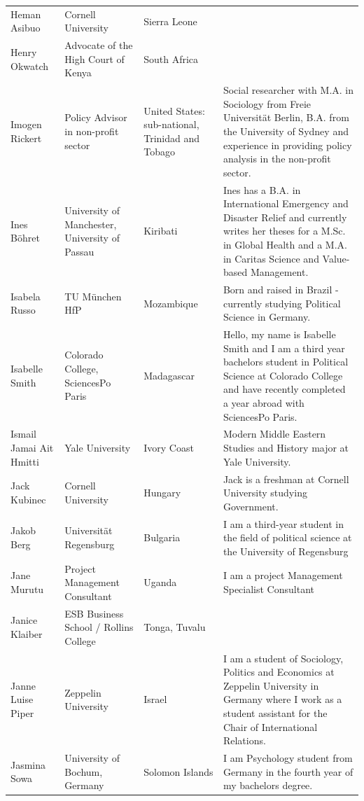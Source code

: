 \documentclass[]{article}
\begin{document}
\begin{longtable}{l>{\raggedright\arraybackslash}p{2cm}>{\raggedright\arraybackslash}p{2cm}>{\raggedright\arraybackslash}p{3cm}}
\rowcolor{gray!6}  Heman Asibuo & Cornell University & Sierra Leone & \\
\addlinespace
Henry Okwatch & Advocate of the High Court of Kenya & South Africa & \\
\rowcolor{gray!6}  Imogen Rickert & Policy Advisor in non-profit sector & United States: sub-national, Trinidad and Tobago & Social researcher with M.A. in Sociology from Freie Universität Berlin, B.A. from the University of Sydney and experience in providing policy analysis in the non-profit sector.\\
Ines Böhret & University of Manchester, University of Passau & Kiribati & Ines has a B.A. in International Emergency and Disaster Relief and currently writes her theses for a M.Sc. in Global Health and a M.A. in Caritas Science and Value-based Management.\\
\rowcolor{gray!6}  Isabela Russo & TU München HfP & Mozambique & Born and raised in Brazil - currently studying Political Science in Germany.\\
Isabelle Smith & Colorado College, SciencesPo Paris & Madagascar & Hello, my name is Isabelle Smith and I am a third year bachelors student in Political Science at Colorado College and have recently completed a year abroad with SciencesPo Paris.\\
\addlinespace
\rowcolor{gray!6}  Ismail Jamai Ait Hmitti & Yale University & Ivory Coast & Modern Middle Eastern Studies and History major at Yale University.\\
Jack Kubinec & Cornell University & Hungary & Jack is a freshman at Cornell University studying Government.\\
\rowcolor{gray!6}  Jakob Berg & Universität Regensburg & Bulgaria & I am a third-year student in the field of political science at the University of Regensburg\\
Jane Murutu & Project Management Consultant & Uganda & I am a project Management Specialist Consultant\\
\rowcolor{gray!6}  Janice Klaiber & ESB Business School / Rollins College & Tonga, Tuvalu & \\
\addlinespace
Janne Luise Piper & Zeppelin University & Israel & I am a student of Sociology, Politics and Economics at Zeppelin University in Germany where I work as a student assistant for the Chair of International Relations.\\
\rowcolor{gray!6}  Jasmina Sowa & University of Bochum, Germany & Solomon Islands & I am Psychology student from Germany in the fourth year of my bachelors degree.\\

\end{longtable}
\end{document}
